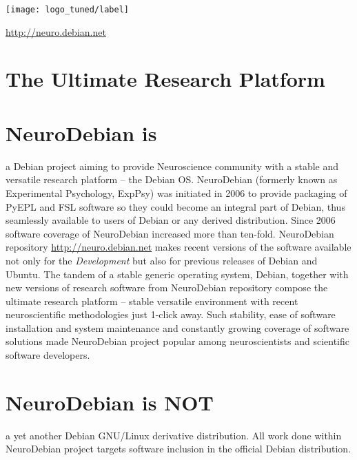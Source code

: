 \documentclass[letterpaper,landscape]{report}
\begin{document}
\pagebreak
\begin{multicols}{3}    %

\begin{center}
\noindent
\vspace{-3em}
\texttt{[image: logo\_tuned/label]}

\url{http://neuro.debian.net}
\section*{The Ultimate Research Platform}

\end{center}

\section*{NeuroDebian is}

a Debian project aiming to provide Neuroscience community with a
stable and versatile research platform -- the Debian OS.  NeuroDebian
(formerly known as Experimental Psychology, ExpPsy) was initiated in
2006 to provide packaging of PyEPL and FSL software so they could
become an integral part of Debian, thus seamlessly available to users
of Debian or any derived distribution.  Since 2006 software coverage
of NeuroDebian increased more than ten-fold.  NeuroDebian repository
\url{http://neuro.debian.net} makes recent versions of the software
available not only for the \emph{Development} but also for previous
releases of Debian and Ubuntu.  The tandem of a stable generic
operating system, Debian, together with new versions of research
software from NeuroDebian repository compose the ultimate research
platform -- stable versatile environment with recent neuroscientific
methodologies just 1-click away.  Such stability, ease of software
installation and system maintenance and constantly growing coverage of
software solutions made NeuroDebian project popular among
neuroscientists and scientific software developers.


\section*{NeuroDebian is NOT}

a yet another Debian GNU/Linux derivative distribution.  All work done
within NeuroDebian project targets software inclusion in the official
Debian distribution.



\end{multicols}
\end{document}
